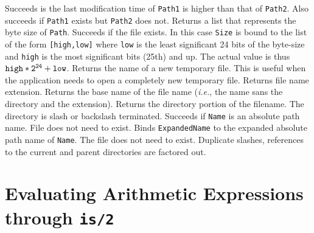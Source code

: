 \begin{description}
  Succeeds is the last modification time of {\tt Path1} is higher than that
  of {\tt Path2}. Also succeeds if {\tt Path1} exists but {\tt Path2} does
  not.
  Returns a list that represents the byte size of {\tt Path}.
  Succeeds if the file exists. In this case {\tt Size} is bound to the list
  of the form {\tt [high,low]} where {\tt low} is the least significant 24
  bits of the byte-size and {\tt high} is the most significant bits (25th)
  and up. The actual value is thus $\tt high*2^{24} + low$.
  Returns the name of a new temporary file. This is useful when the
  application needs to open a completely new temporary file.
  Returns file name extension.
  Returns the base name of the file name ({\it i.e.}, the name sans the
  directory and the extension).
  Returns the directory portion of the filename. The directory is slash or
  backslash terminated.
  Succeeds if {\tt Name} is an absolute path name. File does not need to exist.
  Binds {\tt ExpandedName} to the expanded absolute path name of {\tt Name}.
  The file does not need to exist. Duplicate slashes, references to the
  current and parent directories are factored out.
\end{description}

\section{Evaluating Arithmetic Expressions through {\tt is/2}}
\label{Arithmetic} 


